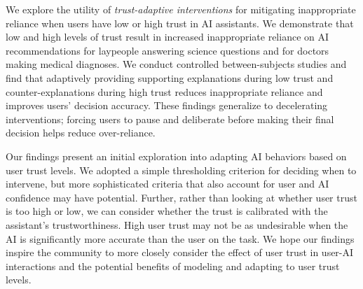 We explore the utility of \emph{trust-adaptive interventions} for mitigating inappropriate reliance when users have low or high trust in AI assistants. 
We demonstrate that low and high levels of trust result in increased inappropriate reliance on AI recommendations for laypeople answering science questions and for doctors making medical diagnoses.
We conduct controlled between-subjects studies and find that adaptively providing supporting explanations during low trust and counter-explanations during high trust reduces inappropriate reliance and improves users' decision accuracy. 
These findings generalize to decelerating interventions; forcing users to pause and deliberate before making their final decision helps reduce over-reliance.

Our findings present an initial exploration into adapting AI behaviors based on user trust levels.
We adopted a simple thresholding criterion for deciding when to intervene, but more sophisticated criteria that also account for user and AI confidence may have potential. 
Further, rather than looking at whether user trust is too high or low, we can consider whether the trust is calibrated with the assistant's trustworthiness. 
High user trust may not be as undesirable when the AI is significantly more accurate than the user on the task. 
We hope our findings inspire the community to more closely consider the effect of user trust in user-AI interactions and the potential benefits of modeling and adapting to user trust levels.


\newpage

